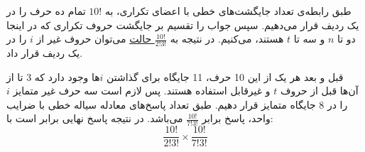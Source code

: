\p
طبق رابطه‌ی تعداد جایگشت‌های خطی با اعضای تکراری، به 
$10!$
تمام ده حرف را در یک ردیف قرار می‌دهیم. سپس جواب را تقسیم بر جایگشت حروف تکراری که در اینجا دو تا $n$ و سه تا $t$ هستند، می‌کنیم.
 در نتیجه به 
\underline{$\frac{10!}{2!3!}$ حالت}
 می‌توان حروف غیر از
 $i$ را در یک ردیف قرار داد.

 قبل و بعد هر یک از این 10 حرف، 11 جایگاه برای گذاشتن
 $i$ها 
  وجود دارد که 3 تا از آن‌ها قبل از حروف 
  $t$
   و غیرقابل استفاده
  هستند.
پس لازم است سه حرف غیر متمایز
$i$
را
در 8 جایگاه متمایز قرار دهیم. 
طبق تعداد پاسخ‌های معادله سیاله خطی با ضرایب واحد،
پاسخ برابر
\underline{$\frac{10!}{7!3!}$}
می‌باشد.
در نتیجه پاسخ نهایی برابر است با:
$$\frac{10!}{2!3!}  \times \frac{10!}{7!3!}$$

